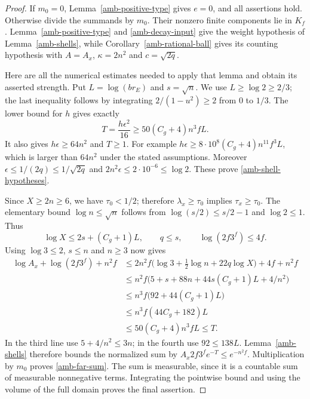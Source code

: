 \begin{proof}
If $m_0=0$, Lemma~\ref{amb-positive-type} gives $e=0$, and all
assertions hold. Otherwise divide the summands by $m_0$.
Their nonzero finite components lie in $K_f$.
Lemma~\ref{amb-positive-type} and \eqref{amb-decay-input} give
the weight hypothesis of Lemma~\ref{amb-shells}, while
Corollary~\ref{amb-rational-ball} gives its counting hypothesis
with $A=A_x$, $\kappa=2n^2$ and $c=\sqrt{2q}$.

Here are all the numerical estimates needed to apply that lemma
and obtain its asserted strength. Put $L=\log(br_E)$ and
$s=\sqrt n$. We use $L\ge\log2\ge2/3$; the last inequality
follows by integrating $2/(1-u^2)\ge2$ from $0$ to $1/3$.
The lower bound for $h$ gives exactly
\begin{equation}\label{amb-T-lower}
 T=\frac{h\epsilon^2}{16}
                      \ge50(C_g+4)n^3fL.
\end{equation}
It also gives $h\epsilon\ge64n^2$ and $T\ge1$.
For example
$h\epsilon\ge8\cdot10^8(C_g+4)n^{11}f^3L$, which is
larger than $64n^2$ under the stated assumptions.
Moreover $\epsilon\le1/(2q)\le1/\sqrt{2q}$ and
$2n^2\epsilon\le2\cdot10^{-6}\le\log2$.
These prove \eqref{amb-shell-hypotheses}.

Since $X\ge2n\ge6$, we have $\tau_0<1/2$; therefore
$\lambda_x\ge\tau_0$ implies $\tau_x\ge\tau_0$.
The elementary bound $\log n\le\sqrt n$ follows from
$\log(s/2)\le s/2-1$ and $\log2\le1$. Thus
\[
 \log X\le2s+(C_g+1)L,\qquad q\le s,
 \qquad \log(2f3^f)\le4f.
\]
Using $\log3\le2$, $s\le n$ and $n\ge3$ now gives
\begin{align*}
 \log A_x+\log(2f3^f)+n^2f
 &\le2n^2f\bigl(\log3+\tfrac12\log n+22q\log X\bigr)
                                                        +4f+n^2f\\
 &\le n^2f\bigl(5+s+88n+44s(C_g+1)L+4/n^2\bigr)\\
 &\le n^3f\bigl(92+44(C_g+1)L\bigr)\\
 &\le n^3f(44C_g+182)L\\
 &\le50(C_g+4)n^3fL\le T.
\end{align*}
In the third line use $5+4/n^2\le3n$; in the fourth use
$92\le138L$. Lemma~\ref{amb-shells} therefore bounds the
normalized sum by $A_x2f3^fe^{-T}\le e^{-n^2f}$.
Multiplication by $m_0$ proves \eqref{amb-far-sum}.
The sum is measurable, since it is a countable sum of measurable
nonnegative terms. Integrating the pointwise bound and using
the volume of the full domain proves the final assertion.
\end{proof}

